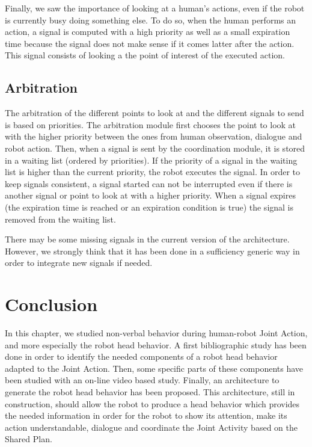 \documentclass[english,a4paper,11pt,twoside]{StyleThese}
\begin{document}
Finally, we saw the importance of looking at a human's actions, even if the robot is currently busy doing something else. To do so, when the human performs an action, a signal is computed with a high priority as well as a small expiration time because the signal does not make sense if it comes latter after the action. This signal consists of looking a the point of interest of the executed action. 

\subsection{Arbitration}

The arbitration of the different points to look at and the different signals to send is based on priorities. The arbitration module first chooses the point to look at with the higher priority between the ones from human observation, dialogue and robot action. Then, when a signal is sent by the coordination module, it is stored in a waiting list (ordered by priorities). If the priority of a signal in the waiting list is higher than the current priority, the robot executes the signal. In order to keep signals consistent, a signal started can not be interrupted even if there is another signal or point to look at with a higher priority. When a signal expires (the expiration time is reached or an expiration condition is true) the signal is removed from the waiting list.

There may be some missing signals in the current version of the architecture. However, we strongly think that it has been done in a sufficiency generic way in order to integrate new signals if needed.

\section{Conclusion}

In this chapter, we studied non-verbal behavior during human-robot Joint Action, and more especially the robot head behavior. A first bibliographic study has been done in order to identify the needed components of a robot head behavior adapted to the Joint Action. Then, some specific parts of these components have been studied with an on-line video based study. Finally, an architecture to generate the robot head behavior has been proposed. This architecture, still in construction, should allow the robot to produce a head behavior which provides the needed information in order for the robot to show its attention, make its action understandable, dialogue and coordinate the  Joint Activity based on the Shared Plan.

\ifdefined{}
\else


\end{document}
